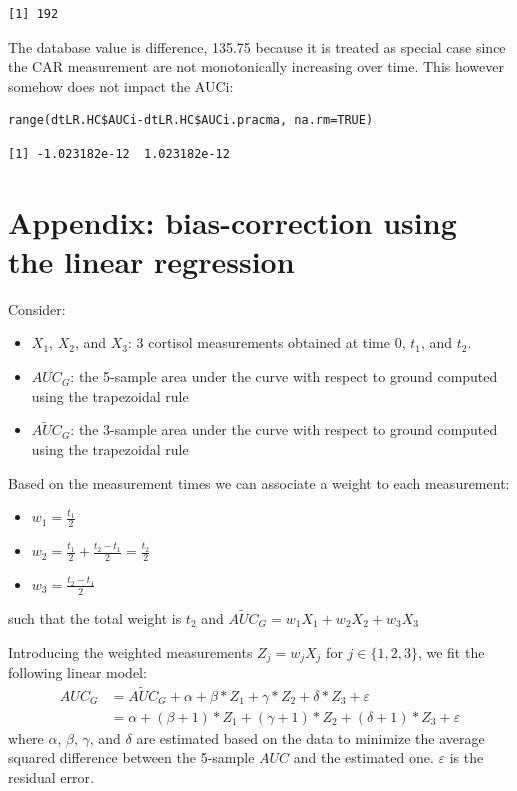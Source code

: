 \documentclass[12pt]{article}
\begin{document}
\begin{verbatim}
[1] 192
\end{verbatim}


The database value is difference, 135.75 because it is treated as
special case since the CAR measurement are not monotonically
increasing over time. This however somehow does not impact the AUCi:
\lstset{language=r,label= ,caption= ,captionpos=b,numbers=none}
\begin{lstlisting}
range(dtLR.HC$AUCi-dtLR.HC$AUCi.pracma, na.rm=TRUE)
\end{lstlisting}

\begin{verbatim}
[1] -1.023182e-12  1.023182e-12
\end{verbatim}



\clearpage

\section{Appendix: bias-correction using the linear regression}
\label{appendix:lm}
Consider:
\begin{itemize}
\item \(X_1\), \(X_2\), and \(X_3\): 3 cortisol measurements obtained at time \(0\), \(t_1\), and \(t_2\).
\item \(AUC_G\): the 5-sample area under the curve with respect to ground computed using the trapezoidal rule
\item \(\widetilde{AUC}_G\): the 3-sample area under the curve with respect to ground computed using the trapezoidal rule
\end{itemize}

\bigskip

Based on the measurement times we can associate a weight to each
measurement:
\begin{itemize}
\item \(w_1 = \frac{t_1}{2}\)
\item \(w_2 = \frac{t_1}{2}+\frac{t_2-t_1}{2}=\frac{t_2}{2}\)
\item \(w_3 = \frac{t_2-t_1}{2}\)
\end{itemize}
such that the total weight is \(t_2\) and \(\widetilde{AUC}_G= w_1 X_1 + w_2 X_2 + w_3 X_3\)

\bigskip

Introducing the weighted measurements \(Z_j=w_j X_j\) for
\(j\in\{1,2,3\}\), we fit the following linear model:
\begin{align*}
AUC_G &= \widetilde{AUC}_G + \alpha + \beta * Z_1 + \gamma * Z_2 + \delta * Z_3 + \varepsilon \\
 &= \alpha + (\beta+1) * Z_1 + (\gamma+1) * Z_2 + (\delta+1) * Z_3 + \varepsilon 
\end{align*}
where \(\alpha\), \(\beta\), \(\gamma\), and \(\delta\) are
  estimated based on the data to minimize the average squared
  difference between the 5-sample \(AUC\) and the estimated
  one. \(\varepsilon\) is the residual error.
\end{document}
